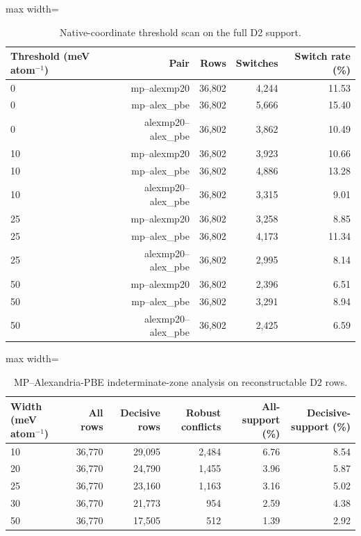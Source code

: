 \begin{table}[H]
\centering
\sitablefont
\caption{Native-coordinate threshold scan on the full D2 support.}
\label{tab:v3-threshold}
\begin{adjustbox}{max width=\linewidth}
\begin{tabular}{@{}lrrrr@{}}
\toprule
Threshold (meV atom$^{-1}$) & Pair & Rows & Switches & Switch rate (\%) \\
\midrule
0 & mp--alexmp20 & 36,802 & 4,244 & 11.53 \\
0 & mp--alex\_pbe & 36,802 & 5,666 & 15.40 \\
0 & alexmp20--alex\_pbe & 36,802 & 3,862 & 10.49 \\
10 & mp--alexmp20 & 36,802 & 3,923 & 10.66 \\
10 & mp--alex\_pbe & 36,802 & 4,886 & 13.28 \\
10 & alexmp20--alex\_pbe & 36,802 & 3,315 & 9.01 \\
25 & mp--alexmp20 & 36,802 & 3,258 & 8.85 \\
25 & mp--alex\_pbe & 36,802 & 4,173 & 11.34 \\
25 & alexmp20--alex\_pbe & 36,802 & 2,995 & 8.14 \\
50 & mp--alexmp20 & 36,802 & 2,396 & 6.51 \\
50 & mp--alex\_pbe & 36,802 & 3,291 & 8.94 \\
50 & alexmp20--alex\_pbe & 36,802 & 2,425 & 6.59 \\
\bottomrule
\end{tabular}
\end{adjustbox}
\end{table}


\begin{table}[H]
\centering
\sitablefont
\caption{MP--Alexandria-PBE indeterminate-zone analysis on reconstructable D2 rows.}
\label{tab:v3-indeterminate}
\begin{adjustbox}{max width=\linewidth}
\begin{tabular}{@{}lrrrrr@{}}
\toprule
Width (meV atom$^{-1}$) & All rows & Decisive rows & Robust conflicts & All-support (\%) & Decisive-support (\%) \\
\midrule
10 & 36,770 & 29,095 & 2,484 & 6.76 & 8.54 \\
20 & 36,770 & 24,790 & 1,455 & 3.96 & 5.87 \\
25 & 36,770 & 23,160 & 1,163 & 3.16 & 5.02 \\
30 & 36,770 & 21,773 & 954 & 2.59 & 4.38 \\
50 & 36,770 & 17,505 & 512 & 1.39 & 2.92 \\
\bottomrule
\end{tabular}
\end{adjustbox}
\end{table}


